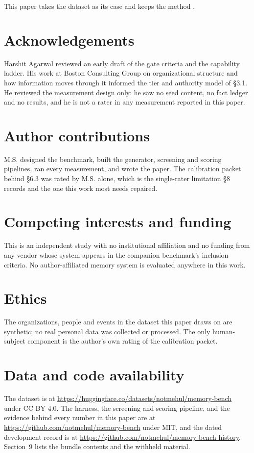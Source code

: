 \documentclass[11pt]{article}
\begin{document}
This paper takes the dataset as its case and keeps the method
\cite{companion}.

\section*{Acknowledgements}
Harshit Agarwal reviewed an early draft of the gate criteria and the capability
ladder. His work at Boston Consulting Group on organizational structure and how
information moves through it informed the tier and authority model of \S3.1. He
reviewed the measurement design only: he saw no seed content, no fact ledger and
no results, and he is not a rater in any measurement reported in this paper.

\section*{Author contributions}
M.S. designed the benchmark, built the generator, screening and scoring
pipelines, ran every measurement, and wrote the paper. The calibration packet
behind \S6.3 was rated by M.S. alone, which is the single-rater limitation \S8
records and the one this work most needs repaired.

\section*{Competing interests and funding}
This is an independent study with no institutional affiliation and no funding
from any vendor whose system appears in the companion benchmark's inclusion
criteria. No author-affiliated memory system is evaluated anywhere in this work.

\section*{Ethics}
The organizations, people and events in the dataset this paper draws on are
synthetic; no real personal data was collected or processed. The only
human-subject component is the author's own rating of the calibration packet.

\section*{Data and code availability}
The dataset is at \url{https://huggingface.co/datasets/notmehul/memory-bench}
under CC BY 4.0. The harness, the screening and scoring pipeline, and the
evidence behind every number in this paper are at
\url{https://github.com/notmehul/memory-bench} under MIT, and the dated
development record is at \url{https://github.com/notmehul/memory-bench-history}.
Section~9 lists the bundle contents and the withheld material.
\end{document}
